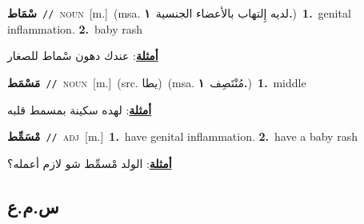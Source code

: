 \documentclass[10pt,a4paper,twoside]{article} %
\begin{document}
\begin{multicols}{2}
{\setlength\topsep{0pt}\textbf{\foreignlanguage{arabic}{سْمَاط}}\ {\color{gray}\texttt{//}\color{black}}\ \textsc{noun}\ [m.]\ \color{gray}(msa. \foreignlanguage{arabic}{لديه إِلتهاب بالأعضاء الجنسية}~\foreignlanguage{arabic}{\textbf{١.}})\color{black}\ \textbf{1.}~genital inflammation.  \textbf{2.}~baby rash\  \begin{flushright}\color{gray}\foreignlanguage{arabic}{\textbf{\underline{\foreignlanguage{arabic}{أمثلة}}}: عندك دهون سْماط للصغار}\end{flushright}\color{black}} \vspace{2mm}

{\setlength\topsep{0pt}\textbf{\foreignlanguage{arabic}{مَسْمَط}}\ {\color{gray}\texttt{//}\color{black}}\ \textsc{noun}\ [m.]\ (src. \color{gray}\foreignlanguage{arabic}{يطا}\color{black})\ \color{gray}(msa. \foreignlanguage{arabic}{مُنْتَصِف}~\foreignlanguage{arabic}{\textbf{١.}})\color{black}\ \textbf{1.}~middle\  \begin{flushright}\color{gray}\foreignlanguage{arabic}{\textbf{\underline{\foreignlanguage{arabic}{أمثلة}}}: لهده سكينة بمسمط قلبه}\end{flushright}\color{black}} \vspace{2mm}

{\setlength\topsep{0pt}\textbf{\foreignlanguage{arabic}{مْسَمِّط}}\ {\color{gray}\texttt{//}\color{black}}\ \textsc{adj}\ [m.]\ \textbf{1.}~have genital inflammation.  \textbf{2.}~have a baby rash\  \begin{flushright}\color{gray}\foreignlanguage{arabic}{\textbf{\underline{\foreignlanguage{arabic}{أمثلة}}}: الولد مْسمِّط شو لازم أعمله؟}\end{flushright}\color{black}} \vspace{2mm}

\vspace{-3mm}
\subsection*{\color{blue}\foreignlanguage{arabic}{س.م.ع}\color{blue}{}} 


\end{multicols}
\end{document}
